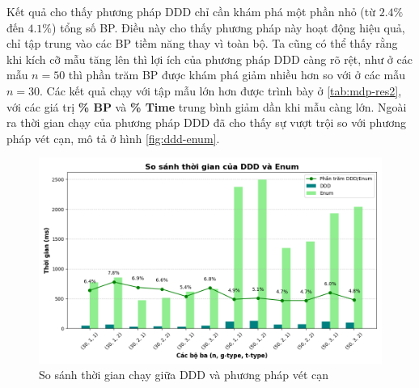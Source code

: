 \documentclass[../main.tex]{subfiles}
\begin{document}
Kết quả cho thấy phương pháp DDD chỉ cần khám phá một phần nhỏ (từ
\(2.4\%\) đến \(4.1\%\)) tổng số BP. Điều này cho thấy phương pháp này
hoạt động hiệu quả, chỉ tập trung vào các BP tiềm năng thay vì toàn bộ.
Ta cũng có thể thấy rằng khi kích cỡ mẫu tăng lên thì
lợi ích của phương pháp DDD càng rõ rệt, như ở các mẫu \(n=50\) thì phần trăm BP được khám phá
giảm nhiều hơn so với ở các mẫu \(n=30\). Các kết quả chạy với tập mẫu lớn hơn được
trình bày ở \autoref{tab:mdp-res2}, với các giá trị \textbf{\% BP} và \textbf{\% Time} trung bình giảm dần khi mẫu
càng lớn. Ngoài ra thời gian chạy của phương pháp DDD đã cho thấy sự vượt trội so với phương pháp vét cạn, mô tả ở hình \autoref{fig:ddd-enum}.

\begin{figure}[h]
  \includegraphics{plots/compare_ddd_enum.png}
  \caption{So sánh thời gian chạy giữa DDD và phương pháp vét cạn}
  \label{fig:ddd-enum}
\end{figure}


%
\backmatter
\end{document}
